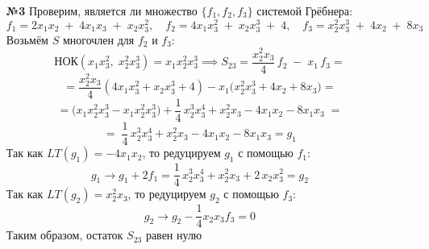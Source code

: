 \documentclass[a4paper]{article}
\renewcommand{\f}[2]{\frac{#1}{#2}}
\begin{document}
\begin{enumerate}
  \item[\textbf{№3}] Проверим, является ли множество $\{f_1, f_2, f_3\}$ системой Грёбнера:
  $$f_1 =  2x_1x_2 \;+\;4x_1x_3\;+\;x_2x_3^2, \quad f_2 =4x_1x_3^2\;+\;x_2x_3^3\;+\;4, \quad f_3 = x_2^2x_3^3\;+\;4x_2\;+\;8x_3 $$
  Возьмём $S$ многочлен для $f_2$ и $f_3$:
  $$\text{НОК}(x_1x_3^2,\;x_2^2x_3^3)=x_1x_2^2x_3^3 
  \implies S_{23}=\frac{x_2^2x_3}{4}\,f_2 \;-\;x_1\,f_3 = $$
  $$=\frac{x_2^2x_3}{4}(4x_1x_3^2+x_2x_3^3+4)
- x_1\bigl(x_2^2x_3^3+4x_2+8x_3\bigr) = $$
  $$
  =\bigl(x_1x_2^2x_3^3 - x_1x_2^2x_3^3\bigr)
  + \frac14\,x_2^3x_3^4
  + x_2^2x_3
  - 4x_1x_2
  - 8x_1x_3
  \;=$$
  $$=\;
  \frac14\,x_2^3x_3^4
  + x_2^2x_3
  - 4x_1x_2
  - 8x_1x_3 = g_1
  $$
  Так как $LT(g_1) = -4x_1x_2$, то редуцируем $g_1$ с помощью $f_1$:
  $$g_1 \to g_1 +2f_1 =  \frac{1}{4}\,x_2^3x_3^4
  + x_2^2x_3
  + 2\,x_2x_3^2 = g_2$$
  Так как $LT(g_2) = x_2^2x_3$, то редуцируем $g_2$ с помощью $f_3$:
  $$g_2 \to g_2 - \f{1}{4}x_2x_3f_3 = 0$$
  Таким образом, остаток \(S_{23}\) равен нулю


\end{enumerate}
\end{document}
